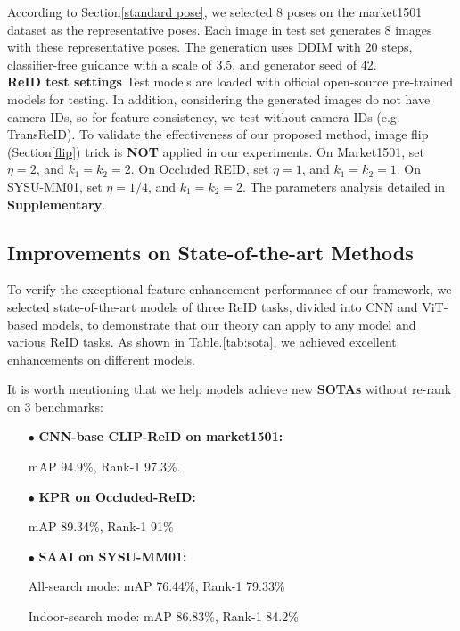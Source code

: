 According to Section\ref{standard pose}, we selected 8 poses on the market1501 dataset as the representative poses. Each image in test set generates 8 images with these representative poses. The generation uses DDIM with 20 steps, classifier-free guidance with a scale of 3.5, and generator seed of 42.
\\
\textbf{ReID test settings}
Test models are loaded with official open-source pre-trained models for testing. In addition, considering the generated images do not have camera IDs, so for feature consistency, we test without camera IDs (e.g. TransReID). To validate the effectiveness of our proposed method, image flip (Section\ref{flip}) trick is \textbf{NOT} applied in our experiments. On Market1501, set \(\eta=2\), and \(k_1=k_2=2\). On Occluded REID, set \(\eta=1\), and \(k_1=k_2=1\). On SYSU-MM01, set \(\eta=1/4\), and \(k_1=k_2=2\). The parameters analysis detailed in \textbf{Supplementary}.



\subsection{Improvements on State-of-the-art Methods}
To verify the exceptional feature enhancement performance of our framework, we selected state-of-the-art models of three ReID tasks, divided into CNN and ViT-based models, to demonstrate that our theory can apply to any model and various ReID tasks. As shown in Table.\ref{tab:sota}, we achieved excellent enhancements on different models.

It is worth mentioning that we help models achieve new \textbf{SOTAs} without re-rank on 3 benchmarks:
\begin{itemize}
    \item[$\bullet$] \textbf{CNN-base CLIP-ReID on market1501: }
    
    \setlength{\parindent}{1em} mAP 94.9\%, Rank-1 97.3\%. 
    \item[$\bullet$] \textbf{KPR on Occluded-ReID: }

    \setlength{\parindent}{1em} mAP 89.34\%, Rank-1 91\%
    
    \item[$\bullet$] \textbf{SAAI on SYSU-MM01: }

    \setlength{\parindent}{1em} All-search mode: mAP 76.44\%, Rank-1 79.33\%
    
    \setlength{\parindent}{1em} Indoor-search mode: mAP 86.83\%, Rank-1 84.2\%
\end{itemize}



